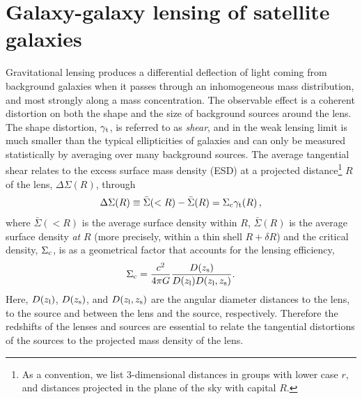 \section{Galaxy-galaxy lensing of satellite galaxies}\label{s:lensing}

Gravitational lensing produces a differential deflection of light coming from background galaxies 
when it passes through an inhomogeneous mass distribution, and most strongly along a mass 
concentration. The observable effect is a coherent distortion on both the shape and the size of 
background sources around the lens. The shape distortion, $\gamma_{\rm t}$, is referred to as 
\emph{shear}, and in the weak lensing limit is much smaller than the typical ellipticities of 
galaxies and can only be measured statistically by averaging over many background sources. The 
average tangential shear relates to the excess surface mass density (ESD) at a projected 
distance\footnote{As a convention, we list 3-dimensional distances in groups with lower case $r$, 
and distances projected in the plane of the sky with capital $R$.} $R$ of the lens, 
$\Delta\Sigma(R)$, through
\begin{equation}\label{eq:gammat}
 \Delta\Sigma(R) \equiv \bar\Sigma(<R)-\bar\Sigma(R) = \Sigma_{\rm c}\gamma_{\rm t}(R)\,,
\end{equation}
where $\bar\Sigma(<R)$ is the average surface density within $R$, $\bar\Sigma(R)$ is the average 
surface density \emph{at} $R$ (more precisely, within a thin shell $R+\delta R$) and the critical 
density, $\Sigma_{\rm c}$, is as a geometrical factor that accounts for the lensing efficiency,
\begin{equation}\label{eq:Sigma_c}
 \Sigma_{\rm c} = \frac{c^2}{4\pi G} \frac{D(z_{\rm s})}{D(z_{\rm l})D(z_{\rm l},z_{\rm s})}.
\end{equation}
Here, $D(z_{\rm l})$, $D(z_{\rm s})$, and $D(z_{\rm l},z_{\rm s})$ are the angular diameter 
distances to the lens, to the source and between the lens and the source, respectively. Therefore 
the redshifts of the lenses and sources are essential to relate the tangential distortions of the 
sources to the projected mass density of the lens.

